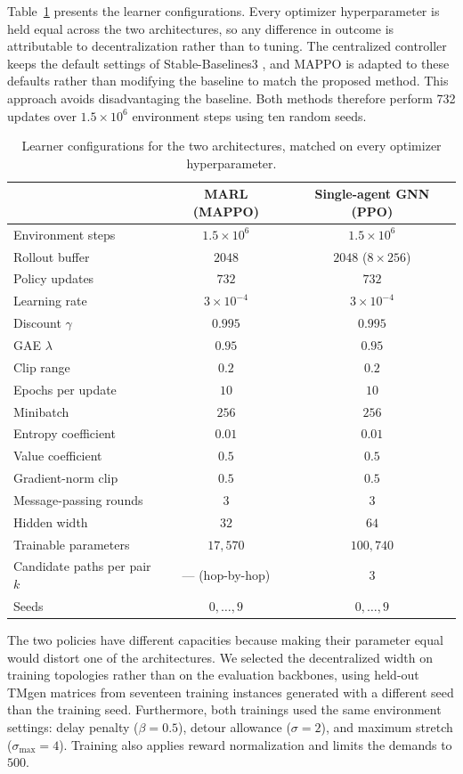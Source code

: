 Table~\ref{tab:hyper} presents the learner configurations. Every optimizer hyperparameter is held equal across the two architectures, so any difference in outcome is attributable to decentralization rather than to tuning. The centralized controller keeps the default settings of Stable-Baselines3 \citep{stable-baselines3}, and MAPPO is adapted to these defaults rather than modifying the baseline to match the proposed method. This approach avoids disadvantaging the baseline. Both methods therefore perform 732 updates over $1.5\times10^{6}$ environment steps using ten random seeds.


\begin{table}[h]
\centering
\small
\caption{Learner configurations for the two architectures, matched on every
optimizer hyperparameter.}
\label{tab:hyper}
\begin{tabular}{lcc}
\hline
& MARL (MAPPO) & Single-agent GNN (PPO) \\
\hline
Environment steps & $1.5\times10^{6}$ & $1.5\times10^{6}$ \\
Rollout buffer & $2048$ & $2048$ ($8\times256$) \\
Policy updates & $732$ & $732$ \\
Learning rate & $3\times10^{-4}$ & $3\times10^{-4}$ \\
Discount $\gamma$ & $0.995$ & $0.995$ \\
GAE $\lambda$ & $0.95$ & $0.95$ \\
Clip range & $0.2$ & $0.2$ \\
Epochs per update & $10$ & $10$ \\
Minibatch & $256$ & $256$ \\
Entropy coefficient & $0.01$ & $0.01$ \\
Value coefficient & $0.5$ & $0.5$ \\
Gradient-norm clip & $0.5$ & $0.5$ \\
Message-passing rounds & $3$ & $3$ \\
Hidden width & $32$ & $64$ \\
Trainable parameters & $17{,}570$ & $100{,}740$ \\
Candidate paths per pair $k$ & --- (hop-by-hop) & $3$ \\
Seeds & $0,\dots,9$ & $0,\dots,9$ \\
\hline
\end{tabular}
\end{table}
The two policies have different capacities because making their parameter equal would distort one of the architectures. We selected the decentralized width on training topologies rather than on the evaluation backbones, using held-out TMgen matrices from seventeen training instances generated with a different seed than the training seed. Furthermore, both trainings used the same environment settings: delay penalty  ($\beta = 0.5$), detour allowance ($\sigma = 2$), and maximum stretch ($\sigma_{\max} = 4$). Training also applies reward normalization and limits the demands to $500$.   


